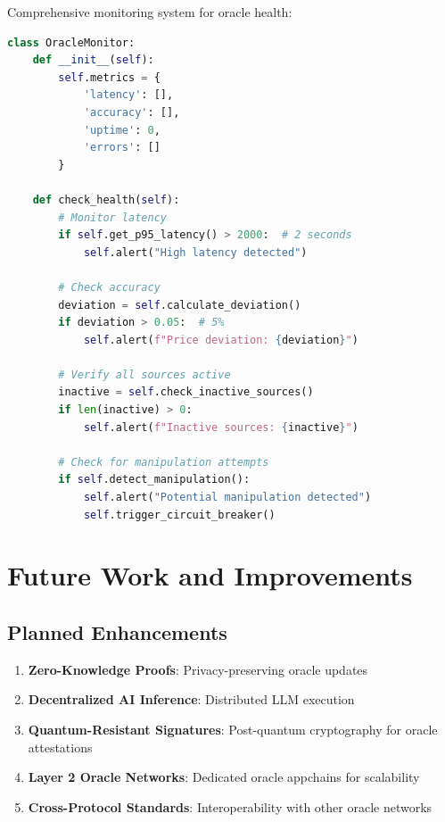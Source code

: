 \documentclass[11pt]{article}
\begin{document}
Comprehensive monitoring system for oracle health:

\begin{lstlisting}[language=Python, caption={Oracle Monitoring System}]
class OracleMonitor:
    def __init__(self):
        self.metrics = {
            'latency': [],
            'accuracy': [],
            'uptime': 0,
            'errors': []
        }
    
    def check_health(self):
        # Monitor latency
        if self.get_p95_latency() > 2000:  # 2 seconds
            self.alert("High latency detected")
        
        # Check accuracy
        deviation = self.calculate_deviation()
        if deviation > 0.05:  # 5%
            self.alert(f"Price deviation: {deviation}")
        
        # Verify all sources active
        inactive = self.check_inactive_sources()
        if len(inactive) > 0:
            self.alert(f"Inactive sources: {inactive}")
        
        # Check for manipulation attempts
        if self.detect_manipulation():
            self.alert("Potential manipulation detected")
            self.trigger_circuit_breaker()
\end{lstlisting}

\section{Future Work and Improvements}

\subsection{Planned Enhancements}

\begin{enumerate}
    \item \textbf{Zero-Knowledge Proofs}: Privacy-preserving oracle updates
    \item \textbf{Decentralized AI Inference}: Distributed LLM execution
    \item \textbf{Quantum-Resistant Signatures}: Post-quantum cryptography for oracle attestations
    \item \textbf{Layer 2 Oracle Networks}: Dedicated oracle appchains for scalability
    \item \textbf{Cross-Protocol Standards}: Interoperability with other oracle networks
\end{enumerate}
\end{document}
